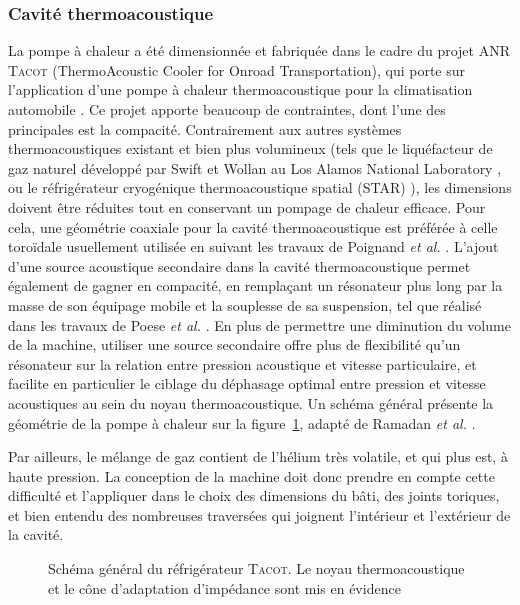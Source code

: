 \subsubsection{Cavité thermoacoustique}
La pompe à chaleur a été dimensionnée et fabriquée dans le cadre du projet ANR \textsc{Tacot} (ThermoAcoustic Cooler for Onroad Transportation), qui porte sur l'application d'une pompe à chaleur thermoacoustique pour la climatisation automobile \cite{ANR_thermo-acoustic_2019}. Ce projet apporte beaucoup de contraintes, dont l'une des principales est la compacité. Contrairement aux autres systèmes thermoacoustiques existant et bien plus volumineux (tels que le liquéfacteur de gaz naturel développé par Swift et Wollan au Los Alamos National Laboratory \cite{swift_thermoacoustics_2002, wollan_development_2002}, ou le réfrigérateur cryogénique thermoacoustique spatial (STAR) \cite{adeff_measurement_1991, garrett_thermoacoustic_1993}), les dimensions doivent être réduites tout en conservant un pompage de chaleur efficace. Pour cela, une géométrie coaxiale pour la cavité thermoacoustique est préférée à celle toroïdale usuellement utilisée en suivant les travaux de Poignand \textit{et al.} \cite{poignand_thermoacoustic_2011, poignand_analysis_2013}. L'ajout d'une source acoustique secondaire dans la cavité thermoacoustique permet également de gagner en compacité, en remplaçant un résonateur plus long par la masse de son équipage mobile et la souplesse de sa suspension, tel que réalisé dans les travaux de Poese \textit{et al.} \cite{poese_thermoacoustic_2004}. En plus de permettre une diminution du volume de la machine, utiliser une source secondaire offre plus de flexibilité qu'un résonateur sur la relation entre pression acoustique et vitesse particulaire, et facilite en particulier le ciblage du déphasage optimal entre pression et vitesse acoustiques au sein du noyau thermoacoustique. Un schéma général présente la géométrie de la pompe à chaleur sur la figure~\ref{fig:SchemaGeneralTACOT}, adapté de Ramadan \textit{et al.} \cite{ramadan_design_2021}. \smallskip

Par ailleurs, le mélange de gaz contient de l'hélium très volatile, et qui plus est, à haute pression. La conception de la machine doit donc prendre en compte cette difficulté et l'appliquer dans le choix des dimensions du bâti, des joints toriques, et bien entendu des nombreuses traversées qui joignent l'intérieur et l'extérieur de la cavité. 

\begin{figure}[!ht]
    \centering
    
    \caption{Schéma général du réfrigérateur \textsc{Tacot}. Le noyau thermoacoustique et le cône d'adaptation d'impédance sont mis en évidence}
    \label{fig:SchemaGeneralTACOT}
\end{figure}

